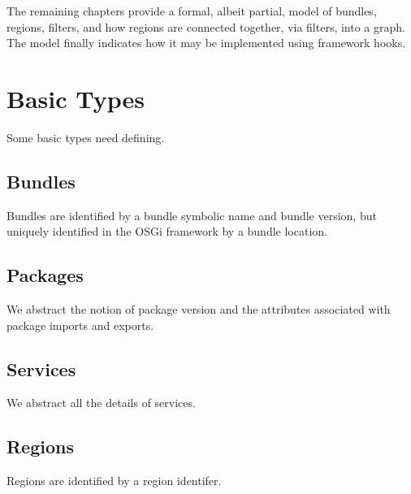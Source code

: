 \documentclass[a4paper,9pt]{article}
\begin{document}
The remaining chapters provide a formal, albeit partial, model of bundles, regions, filters, and how
regions are connected together, via filters, into a graph.
The model finally indicates how it may be implemented using framework hooks.

\clearpage
\section{Basic Types}
\label{cha:basics}

Some basic types need defining.

\subsection*{Bundles}

Bundles are identified by a bundle symbolic name and bundle version, but uniquely identified in the
OSGi framework by a bundle location.
\begin{zed}
\end{zed}

\subsection*{Packages}

We abstract the notion of package version and the attributes associated with package imports and exports.
\begin{zed}
  [Package]
\end{zed}

\subsection*{Services}

We abstract all the details of services.
\begin{zed}
  [Service]
\end{zed}

\subsection*{Regions}

Regions are identified by a region identifer.
\begin{zed}
  [RId]
\end{zed}

\clearpage
\end{document}
